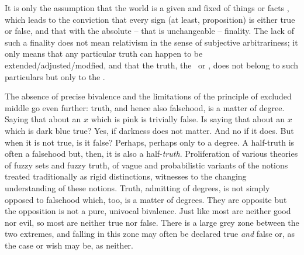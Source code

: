 \pa\label{pa:fixedTruth}
It is only the assumption that the world is a given and fixed  of
things or facts , which leads to the conviction that every
sign (at least, proposition) is either true or false, and that with the 
absolute -- that is unchangeable -- finality. The lack
of such a finality does not mean relativism in the sense of subjective
arbitrariness; it only means that any particular truth can happen to be
extended/adjusted/modfied, and that the  truth, the 
\yes\ or \No, does not belong to such
particulars but only to the .

The absence of precise bivalence and the limitations of the principle of
excluded middle go even further: truth, and hence also falsehood, is a matter of
degree.  Saying that  about an $x$ which is pink is trivially
false.  Is saying that  about an $x$ which is dark blue true?
Yes, if darkness does not matter. And no if it does. But when it is not true, is
it false? Perhaps, perhaps only to a degree.  A half-truth is often a falsehood
but, then, it is also a half-{\em truth}.  Proliferation of various theories of
fuzzy sets and fuzzy truth, of vague and probabilistic variants of the notions
treated traditionally as rigid distinctions, witnesses to the changing
understanding of these notions.  Truth, admitting of degrees, is not simply
opposed to falsehood which, too, is a matter of degrees. They are opposite but
the opposition is not a pure, univocal bivalence. Just like most  are
neither good nor evil, so most  are neither true nor false.
There is a large grey zone between the two extremes, and  falling in
this zone may often be declared true {\em and} false or, as the case or wish may
be, as neither.

    
